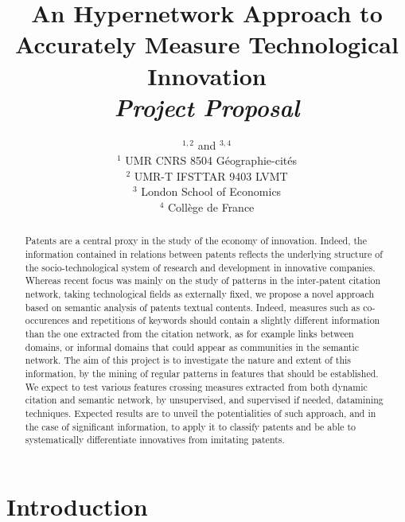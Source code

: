 


\title{
An Hypernetwork Approach to Accurately Measure Technological Innovation
\bigskip\\
\textit{Project Proposal}
}
\author{$^{1,2}$ and $^{3,4}$\medskip\\
$^{1}$ UMR CNRS 8504 G{\'e}ographie-cit{\'e}s\\
$^{2}$ UMR-T IFSTTAR 9403 LVMT\\
$^{3}$ London School of Economics\\
$^{4}$ Coll{\`e}ge de France
}
\date{}


\maketitle

\justify


\begin{abstract}
Patents are a central proxy in the study of the economy of innovation. Indeed, the information contained in relations between patents reflects the underlying structure of the socio-technological system of research and development in innovative companies. Whereas recent focus was mainly on the study of patterns in the inter-patent citation network, taking technological fields as externally fixed, we propose a novel approach based on semantic analysis of patents textual contents. Indeed, measures such as co-occurences and repetitions of keywords should contain a slightly different information than the one extracted from the citation network, as for example links between domains, or informal domains that could appear as communities in the semantic network. The aim of this project is to investigate the nature and extent of this information, by the mining of regular patterns in features that should be established. We expect to test various features crossing measures extracted from both dynamic citation and semantic network, by unsupervised, and supervised if needed, datamining techniques. Expected results are to unveil the potentialities of such approach, and in the case of significant information, to apply it to classify patents and be able to systematically differentiate innovatives from imitating patents.
\end{abstract}


\section{Introduction}

